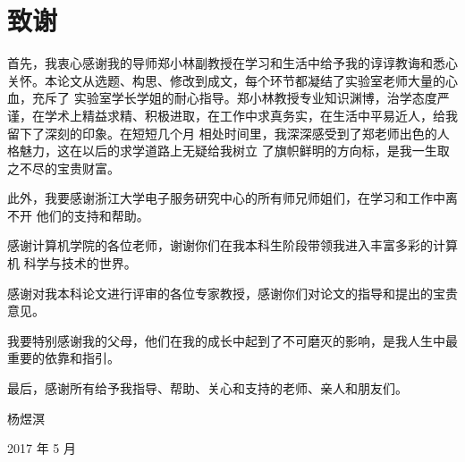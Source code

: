 \chapter*{致谢}

首先，我衷心感谢我的导师郑小林副教授在学习和生活中给予我的谆谆教诲和悉心关怀。本论文从选题、构思、修改到成文，每个环节都凝结了实验室老师大量的心血，充斥了 实验室学长学姐的耐心指导。郑小林教授专业知识渊博，治学态度严谨，在学术上精益求精、积极进取，在工作中求真务实，在生活中平易近人，给我留下了深刻的印象。在短短几个月 相处时间里，我深深感受到了郑老师出色的人格魅力，这在以后的求学道路上无疑给我树立 了旗帜鲜明的方向标，是我一生取之不尽的宝贵财富。

此外，我要感谢浙江大学电子服务研究中心的所有师兄师姐们，在学习和工作中离不开 他们的支持和帮助。

感谢计算机学院的各位老师，谢谢你们在我本科生阶段带领我进入丰富多彩的计算机 科学与技术的世界。

感谢对我本科论文进行评审的各位专家教授，感谢你们对论文的指导和提出的宝贵意见。

我要特别感谢我的父母，他们在我的成长中起到了不可磨灭的影响，是我人生中最重要的依靠和指引。

最后，感谢所有给予我指导、帮助、关心和支持的老师、亲人和朋友们。

\begin{flushright}
杨煜溟

2017 年 5 月
\end{flushright}

